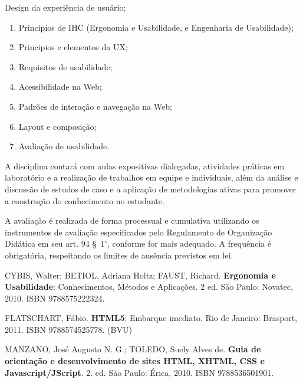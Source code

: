 \begin{pud}
\begin{description}[itemsep=0em]
          \item[UNIDADE VI:]  Design da experiência de usuário;
	         \begin{enumerate}[itemsep=0em, topsep=0em]
  				\item Princípios de IHC (Ergonomia e Usabilidade, e Engenharia de Usabilidade);
				\item Principios e elementos da UX;
				\item Requisitos de usabilidade;
				\item Acessibilidade na Web;
				\item Padrões de interação e navegação na Web;
				\item Layout e composição;
				\item Avaliação de usabilidade.
	        
                
            \end{enumerate}
	\end{description}
	
	
		
	\metodologia	
    A disciplina contará com aulas expositivas dialogadas, atividades práticas em laboratório e a realização de trabalhos em equipe e individuais, além da análise e discussão de estudos de caso e a aplicação de metodologias ativas para promover a construção do conhecimento no estudante.
    

	\avaliacao
	A avaliação é realizada de forma processual e cumulativa utilizando os instrumentos de avaliação especificados pelo Regulamento de Organização Didática em seu art. 94 \S~1$^\circ$, conforme for mais adequado. A frequência é obrigatória, respeitando os limites de ausência previstos em lei.
	
	\begin{bibbasica}
		
		\item CYBIS, Walter; BETIOL, Adriana Holtz; FAUST, Richard. \textbf{Ergonomia e Usabilidade}: Conhecimentos, Métodos e Aplicações. 2 ed. São Paulo: Novatec, 2010. ISBN 9788575222324.
	    \item FLATSCHART, Fábio. \textbf{HTML5}: Embarque imediato. Rio de Janeiro: Brasport, 2011.  ISBN 9788574525778. (BVU)
	    \item MANZANO, José Augusto N. G.; TOLEDO, Suely Alves de. \textbf{Guia de orientação e desenvolvimento de sites HTML, XHTML, CSS e Javascript/JScript}. 2. ed. São Paulo: Érica, 2010. ISBN 9788536501901.

	\end{bibbasica}
	

\end{pud}
